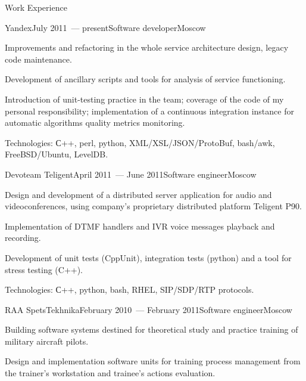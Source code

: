 \documentclass{resume} %
\begin{document}
\begin{rSection}{Work Experience}
\begin{rSubsection}{Yandex}{July 2011~--- present}{Software developer}{Moscow}
\item Improvements and refactoring in the whole service architecture design, legacy code maintenance.

\item Development of ancillary scripts and tools for analysis of service functioning.

\item Introduction of unit-testing practice in the team; coverage of the code of my personal responsibility; implementation of a continuous integration instance for automatic algorithms quality metrics monitoring.

\item Technologies: С++, perl, python, XML/XSL/JSON/ProtoBuf, bash/awk, FreeBSD/Ubuntu, 
LevelDB.
\end{rSubsection}


\begin{rSubsection}{Devoteam Teligent}{April 2011~--- June 2011}{Software engineer}{Moscow}

\item Design and development of a distributed server application for audio and videoconferences, 
using company's proprietary distributed platform Teligent P90. 

\item Implementation of DTMF handlers and IVR voice messages playback and recording.

\item Development of unit tests (CppUnit), integration tests (python) and a tool for stress testing (C++).

\item Technologies: С++, python, bash, RHEL, SIP/SDP/RTP protocols.
\end{rSubsection}


\begin{rSubsection}{RAA SpetsTekhnika}{February 2010~--- February 2011}{Software engineer}{Moscow}

\item Building software systems destined for theoretical study and practice training of military aircraft pilots.

\item Design and implementation software units for training process management from the trainer's 
workstation and trainee's actions evaluation.


\end{rSubsection}
\end{rSection}
\end{document}
